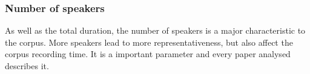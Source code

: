 \documentclass[conference]{IEEEtran}
\begin{document}


\subsubsection{Number of speakers}

As well as the total duration, the number of speakers is a major characteristic to the corpus. More speakers lead to more representativeness, but also affect the corpus recording time. It is a important parameter and every paper analysed describes it.

\end{document}
